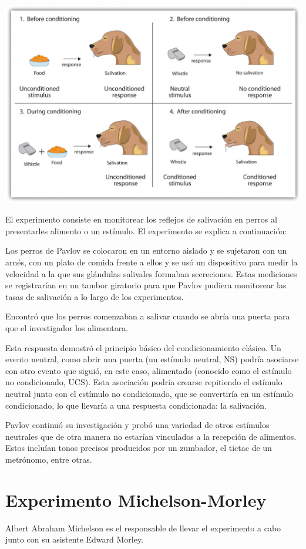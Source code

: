 \documentclass[letterpaper, 10pt, journal]{IEEEtran}
\begin{document}
\includegraphics[scale=0.12]{parlov}

El experimento consiste en monitorear los reflejos de salivación en perros al presentarles alimento o un estímulo. El experimento se explica a continuación:

Los perros de Pavlov se colocaron en un entorno aislado y se sujetaron con un arnés, con un plato de comida frente a ellos y se usó un dispositivo para medir la velocidad a la que sus glándulas salivales formaban secreciones. Estas mediciones se registrarían en un tambor giratorio para que Pavlov pudiera monitorear las tasas de salivación a lo largo de los experimentos.

Encontró que los perros comenzaban a salivar cuando se abría una puerta para que el investigador los alimentara.

Esta respuesta demostró el principio básico del condicionamiento clásico. Un evento neutral, como abrir una puerta (un estímulo neutral, NS) podría asociarse con otro evento que siguió, en este caso, alimentado (conocido como el estímulo no condicionado, UCS). Esta asociación podría crearse repitiendo el estímulo neutral junto con el estímulo no condicionado, que se convertiría en un estímulo condicionado, lo que llevaría a una respuesta condicionada: la salivación.

Pavlov continuó su investigación y probó una variedad de otros estímulos neutrales que de otra manera no estarían vinculados a la recepción de alimentos. Estos incluían tonos precisos producidos por un zumbador, el tictac de un metrónomo, entre otras.

\section{Experimento Michelson-Morley}
Albert Abraham Michelson es el responsable de llevar el experimento a cabo junto con su asistente Edward Morley.
\end{document}
